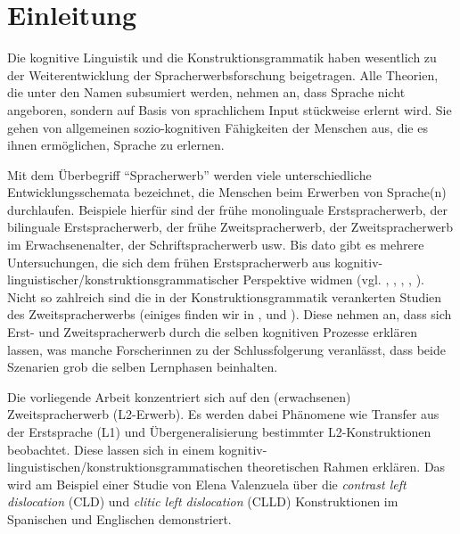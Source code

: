 \section{Einleitung}

\begin{comment}
* ca 3/4 Seiten
* Untersuchungsgegenstand
* Erkenntnisinteresse
* Forschungsstand
* Vorgehensweise: also Section 2 macht blabla, Section 3 blablup, ....
* Ergebnisse können/sollen angedeuten werden
\end{comment}

Die kognitive Linguistik und die Konstruktionsgrammatik haben wesentlich zu der Weiterentwicklung der Spracherwerbsforschung beigetragen.
Alle Theorien, die unter den Namen subsumiert werden, nehmen an, dass Sprache nicht angeboren, sondern auf Basis von sprachlichem Input stückweise erlernt wird.
Sie gehen von allgemeinen sozio-kognitiven Fähigkeiten der Menschen aus, die es ihnen ermöglichen, Sprache zu erlernen.

Mit dem Überbegriff ``Spracherwerb'' werden viele unterschiedliche Entwicklungsschemata bezeichnet, die Menschen beim Erwerben von Sprache(n) durchlaufen.
Beispiele hierfür sind der frühe monolinguale Erstspracherwerb, der bilinguale Erstspracherwerb, der frühe Zweitspracherwerb, der Zweitspracherwerb im Erwachsenenalter, der Schriftspracherwerb usw.
Bis dato gibt es mehrere Untersuchungen, die sich dem frühen Erstspracherwerb aus kognitiv-linguistischer/konstruktionsgrammatischer Perspektive widmen (vgl. \cite{Brooks99}, \cite{Tomasello01}, \cite{Lieven03}, \cite{Tomasello03}, \cite{Tomasello06}).
Nicht so zahlreich sind die in der Konstruktionsgrammatik verankerten Studien des Zweitspracherwerbs (einiges finden wir in \cite{Ellis04}, \cite{Eskildsen08} und \cite{Haberzettl06}).
Diese nehmen an, dass sich Erst- und Zweitspracherwerb durch die selben kognitiven Prozesse erklären lassen, was manche Forscherinnen zu der Schlussfolgerung veranlässt, dass beide Szenarien grob die selben Lernphasen beinhalten.

Die vorliegende Arbeit konzentriert sich auf den (erwachsenen) Zweitspracherwerb (L2-Erwerb).
Es werden dabei Phänomene wie Transfer aus der Erstsprache (L1) und Übergeneralisierung bestimmter L2-Konstruktionen beobachtet.
Diese lassen sich in einem kognitiv-linguistischen/konstruktionsgrammatischen theoretischen Rahmen erklären.
Das wird am Beispiel einer Studie von Elena Valenzuela \cite{Valenzuela05} über die \textit{contrast left dislocation} (CLD) und \textit{clitic left dislocation} (CLLD) Konstruktionen im Spanischen und Englischen demonstriert.

